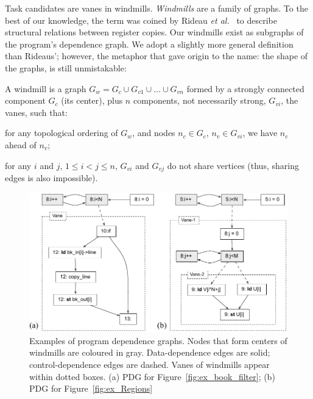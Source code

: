 \documentclass[sigplan,10pt,review,anonymous]{acmart}
\begin{document}
Task candidates are vanes in windmills.
{\em Windmills} are a family of graphs.
To the best of our knowledge, the term was coined by Rideau
{\em et al.}~\cite{Rideau08} to describe structural relations between register
copies.
Our windmills exist as subgraphs of the program's dependence graph.
We adopt a slightly more general definition than Rideaus'; however, the
metaphor that gave origin to the name: the shape of the graphs, is still
unmistakable:

\begin{definition}
\label{def:windmill}
A windmill is a graph $G_w = G_c \cup G_{v1} \cup \ldots \cup G_{vn}$ formed by
a strongly connected component $G_c$ (its center), plus $n$ components, not
necessarily strong, $G_{vi}$, the vanes, such that:
\begin{compactenum}
\item for any topological ordering of $G_w$, and nodes $n_c \in G_c$,
$n_v \in G_{vi}$, we have $n_c$ ahead of $n_v$;
\item for any $i$ and $j$, $1 \leq i < j \leq n$, $G_{vi}$ and $G_{vj}$ do not
share vertices (thus, sharing edges is also impossible).
\end{compactenum}
\end{definition}


\begin{figure}[h]
\begin{center}
\includegraphics[width=1\columnwidth]{images/ex_windmill}
\caption{Examples of program dependence graphs.
Nodes that form centers of windmills are coloured in gray.
Data-dependence edges are solid; control-dependence edges are dashed.
Vanes of windmills appear within dotted boxes.
(a) PDG for Figure~\ref{fig:ex_book_filter};
(b) PDG for Figure~\ref{fig:ex_Regions}}
\label{fig:ex_windmill}
\end{center}
\end{figure}
\end{document}
